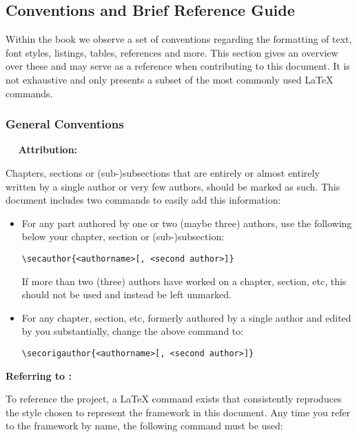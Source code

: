 

\subsection{Conventions and Brief Reference Guide}

Within the \asterics book we observe a set of conventions regarding the formatting of text, font styles, listings, tables, references and more.
This section gives an overview over these and may serve as a reference when contributing to this document.
It is not exhaustive and only presents a subset of the most commonly used \LaTeX{} commands.

\subsubsection{General Conventions}
~~
\textbf{Attribution:}
\smallskip

Chapters, sections or (sub-)subsections that are entirely or almost entirely written by a single author or very few authors, should be marked as such.
This document includes two commands to easily add this information:
\begin{itemize}
\item For any part authored by one or two (maybe three) authors, use the following below your chapter, section or (sub-)subsection:
\begin{lstlisting}[style=LaTeXStyle]
\secauthor{<authorname>[, <second author>]}
\end{lstlisting}
If more than two (three) authors have worked on a chapter, section, etc, this should not be used and instead be left unmarked.

\item For any chapter, section, etc, formerly authored by a single author and edited by you substantially, change the above command to:
\begin{lstlisting}[style=LaTeXStyle]
\secorigauthor{<authorname>[, <second author>]}
\end{lstlisting}
\end{itemize}

\textbf{Referring to \asterics:}
\smallskip

To reference the \asterics project, a \LaTeX{} command exists that consistently reproduces the style chosen to represent the \asterics framework in this document.
Any time you refer to the framework by name, the following command must be used:

